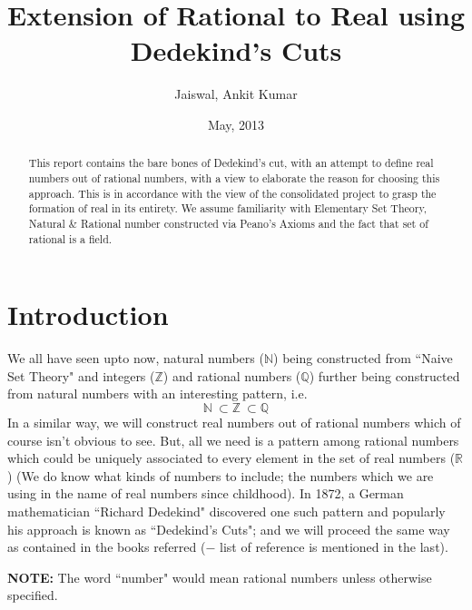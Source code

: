 \documentclass[12pt,a4paper,final,titlepage]{article}
\author{Jaiswal, Ankit Kumar}
\begin{document}
\title{Extension of Rational to Real using Dedekind's Cuts}
\date{May, 2013}
\maketitle

\begin{abstract}
This report contains the bare bones of Dedekind's cut, with an attempt to define real numbers out of rational numbers, with a view to elaborate the reason for choosing this approach. This is in accordance with the view of the consolidated project to grasp the formation of real in its entirety. We assume familiarity with Elementary Set Theory, Natural \& Rational number constructed via Peano's Axioms and the fact that set of rational is a field.
\end{abstract}

\section{Introduction}
We all have seen upto now, natural numbers ($\mathbb{N}$) being constructed from ``Naive Set Theory" and integers ($\mathbb{Z}$) and rational numbers ($\mathbb{Q}$) further being constructed from natural numbers with an interesting pattern, i.e.
\begin{equation}\label{eq1}
\mathbb{N}\:\subset \mathbb{Z}\:\subset \mathbb{Q}
\end{equation}
In a similar way, we will construct real numbers out of rational numbers which of course isn't obvious to see. But, all we need is a pattern among rational numbers which could be uniquely associated to every element in the set of real numbers ($\mathbb{R}$) (We do know what kinds of numbers to include; the numbers which we are using in the name of real numbers since childhood).
In 1872, a German mathematician ``Richard Dedekind" discovered one such pattern and popularly his approach is known as ``Dedekind's Cuts"; and we will proceed the same way as contained in the books referred ($-$ list of reference is mentioned in the last).

\textbf{NOTE:} The word ``number" would mean rational numbers unless otherwise specified.
\end{document}
